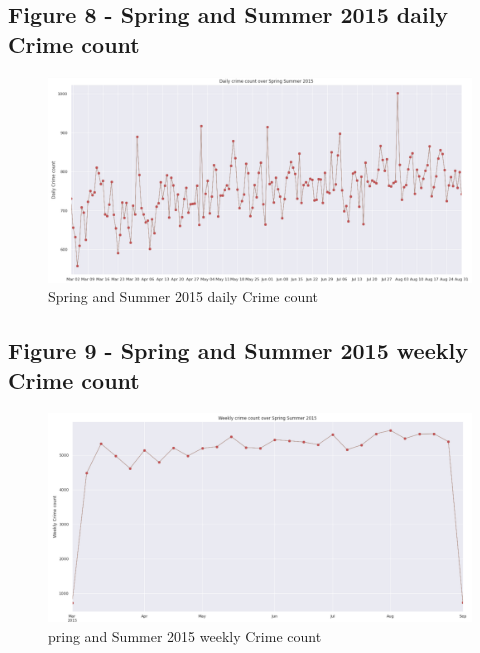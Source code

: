 \documentclass[a4paper, twocolumn]{article}
\begin{document}
\subsection{Figure 8 - Spring and Summer 2015 daily Crime count}\label{appendix:fig3}
\begin{figure}[h]
\includegraphics[width=\textwidth]{fig3.png}
\caption{Spring and Summer 2015 daily Crime count}
\end{figure}
\newpage

\subsection{Figure 9 - Spring and Summer 2015 weekly Crime count}\label{appendix:fig4}
\begin{figure}[h]
\includegraphics[width=\textwidth]{fig4.png}
\caption{pring and Summer 2015 weekly Crime count}
\end{figure}
\end{document}
